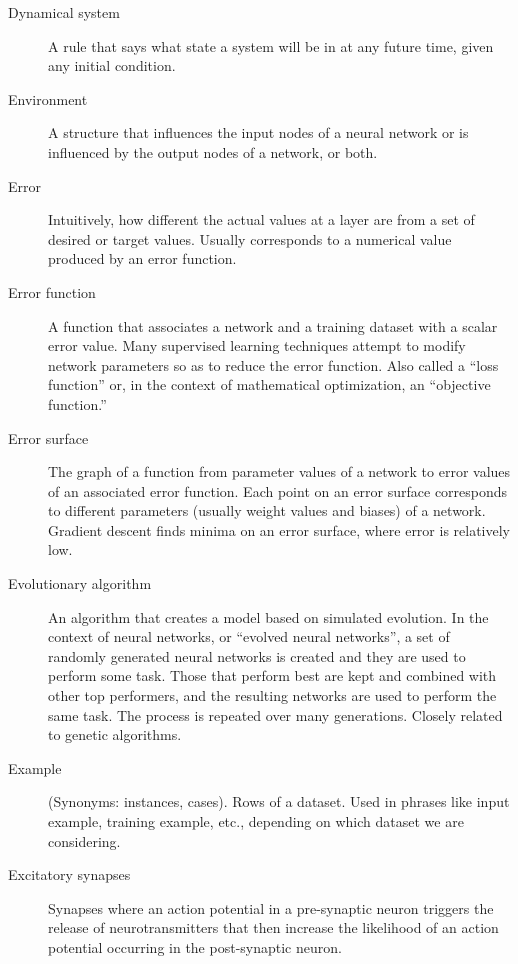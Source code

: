 \begin{description}
\item[Dynamical system] A rule that says what state a system will be in at any future time, given any initial condition.

\item[Environment] A structure that influences the input nodes of a neural network or is influenced by the output nodes of a network, or both.

\item[Error] Intuitively, how different the actual values at a layer are from a set of desired or target values. Usually corresponds to a numerical value produced by an error function.

\item[Error function] A function that associates a network and a training dataset with a scalar error value. Many supervised learning techniques attempt to modify network parameters so as to reduce the error function. Also called a ``loss function'' or, in the context of mathematical optimization, an ``objective function.''

\item[Error surface] The graph of a function from parameter values of a network to error values of an associated error function. Each point on an error surface corresponds to different parameters (usually weight values and biases) of a network. Gradient descent finds minima on an error surface, where error is relatively low.

\item[Evolutionary algorithm] An algorithm that creates a model based on simulated evolution. In the context of neural networks, or ``evolved neural networks'', a set of randomly generated neural networks is created and they are used to perform some task.  Those that perform best are kept and combined with other top performers, and the resulting networks are used to perform the same task. The process is repeated over many generations. Closely related to genetic algorithms.

\item[Example] (Synonyms: instances, cases). Rows of a dataset. Used in phrases like input example, training example, etc., depending on which dataset we are considering.

\item[Excitatory synapses] Synapses where an action potential in a pre-synaptic neuron triggers the release of neurotransmitters that then increase the likelihood of an action potential occurring in the post-synaptic neuron.


\end{description}
